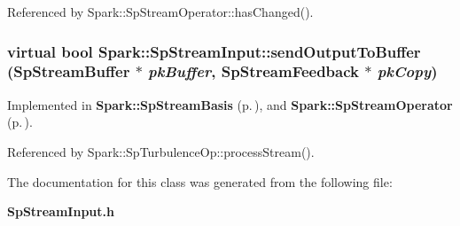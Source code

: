 Referenced by Spark::Sp\-Stream\-Operator::has\-Changed().
\subsubsection{\setlength{\rightskip}{0pt plus 5cm}virtual bool Spark::Sp\-Stream\-Input::send\-Output\-To\-Buffer ({\bf Sp\-Stream\-Buffer} $\ast$ {\em pk\-Buffer}, {\bf Sp\-Stream\-Feedback} $\ast$ {\em pk\-Copy})\hspace{0.3cm}{\tt  [pure virtual]}}\label{classSpark_1_1SpStreamInput_a3}




Implemented in {\bf Spark::Sp\-Stream\-Basis} {\rm (p.\,\pageref{classSpark_1_1SpStreamBasis_a3})}, and {\bf Spark::Sp\-Stream\-Operator} {\rm (p.\,\pageref{classSpark_1_1SpStreamOperator_a4})}.



Referenced by Spark::Sp\-Turbulence\-Op::process\-Stream().

The documentation for this class was generated from the following file:\begin{CompactItemize}
\item 
{\bf Sp\-Stream\-Input.h}\end{CompactItemize}

